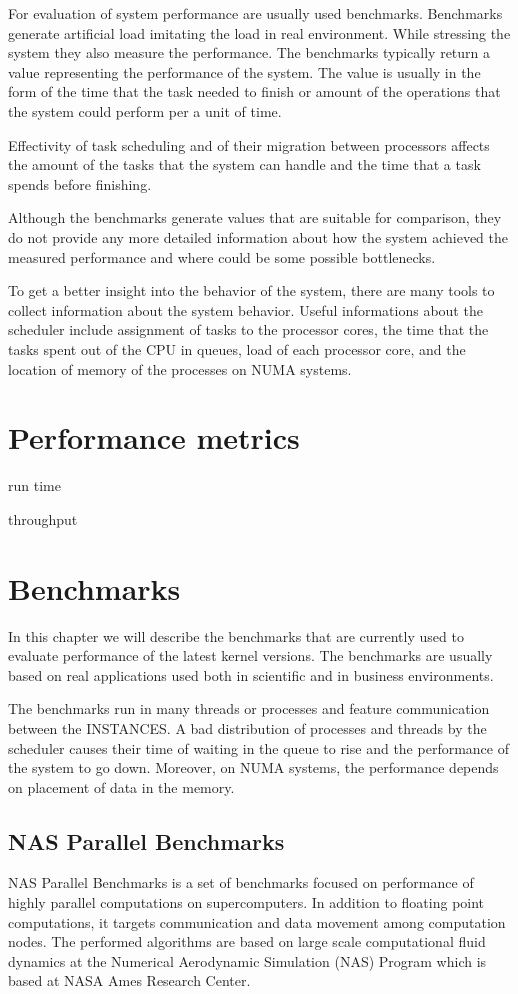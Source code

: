 For evaluation of system performance are usually used benchmarks.
Benchmarks generate artificial load imitating the load in real environment.
While stressing the system they also measure the performance. The benchmarks
typically return a value representing the performance of the system. The value
is usually in the form of the time that the task needed to finish or amount of
the operations that the system could perform per a unit of time.

Effectivity of task scheduling and of their migration between processors affects
the amount of the tasks that the system can handle and the time that a task
spends before finishing.

Although the benchmarks generate values that are suitable for comparison, they
do not provide any more detailed information about how the system achieved the
measured performance and where could be some possible bottlenecks.

To get a better insight into the behavior of the system, there are many tools to
collect information about the system behavior. Useful informations about the
scheduler include assignment of tasks to the processor cores, the time that the
tasks spent out of the CPU in queues, load of each processor core, and the
location of memory of the processes on NUMA systems.

\section{Performance metrics}
run time

throughput

\section{Benchmarks}
In this chapter we will describe the benchmarks that are currently used to evaluate
performance of the latest kernel versions. The benchmarks are usually based on real
applications used both in scientific and in business environments.

The benchmarks run in many threads or processes and feature communication
between the INSTANCES. A bad distribution of processes and threads by the
scheduler causes their time of waiting in the queue to rise and the performance of the
system to go down. Moreover, on NUMA systems, the performance depends on placement of
data in the memory.

\subsection{NAS Parallel Benchmarks}
NAS Parallel Benchmarks is a set of benchmarks focused on performance of highly
parallel computations on supercomputers. In addition to floating point
computations, it targets communication and data movement among computation
nodes. The performed algorithms are based on large scale computational fluid
dynamics at the Numerical Aerodynamic Simulation (NAS) Program which is based at
NASA Ames Research Center.

